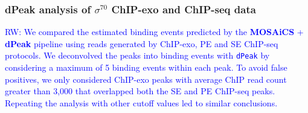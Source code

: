 \documentclass{bmcart}
\newcommand{\SK}[1]{\textcolor{red}{SK: #1}}
\newcommand{\RW}[1]{\textcolor{blue}{RW: #1}}
\newcommand{\sig}{\sigma^{70}}
\begin{document}
\nocite{robinson14}



\subsubsection*{dPeak analysis of $\sig$ ChIP-exo and ChIP-seq data}

\RW{ We compared the estimated binding events predicted by the
  \textbf{MOSAiCS} + \textbf{dPeak} pipeline using reads generated by
  ChIP-exo, PE and SE ChIP-seq protocols. We deconvolved the peaks
  into binding events with \texttt{dPeak} by considering a maximum of
  5 binding events within each peak. To avoid false positives, we only
  considered ChIP-exo peaks with average ChIP read count greater than
  3,000 that overlapped both the SE and PE ChIP-seq peaks. Repeating
  the analysis with other cutoff values led to similar conclusions.  }

\end{document}
